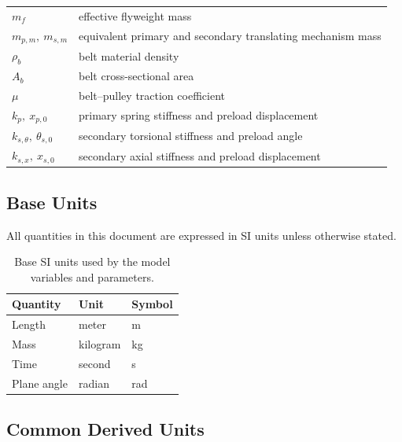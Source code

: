 \documentclass[11pt]{article}
\numberwithin{equation}{section}
\begin{document}
\begin{center}
\begin{longtable}{@{}p{}p{}@{}}
$m_f$ & effective flyweight mass \\
$m_{p,m},\ m_{s,m}$ & equivalent primary and secondary translating mechanism mass \\
$\rho_b$ & belt material density \\
$A_b$ & belt cross-sectional area \\
$\mu$ & belt--pulley traction coefficient \\
$k_p,\ x_{p,0}$ & primary spring stiffness and preload displacement \\
$k_{s,\theta},\ \theta_{s,0}$ & secondary torsional stiffness and preload angle \\
$k_{s,x},\ x_{s,0}$ & secondary axial stiffness and preload displacement \\
\end{longtable}
\normalsize
\end{center}

\subsection{Base Units}

All quantities in this document are expressed in SI units unless otherwise stated.

\begin{table}[H]
\centering
\begin{tabular}{@{}lll@{}}
\toprule
Quantity & Unit & Symbol \\ \midrule
Length & meter & \si{\meter} \\
Mass & kilogram & \si{\kilogram} \\
Time & second & \si{\second} \\
Plane angle & radian & \si{\radian} \\
\bottomrule
\end{tabular}
\caption{Base SI units used by the model variables and parameters.}
\label{tab:si_base}
\end{table}

\subsection{Common Derived Units}
\end{document}
